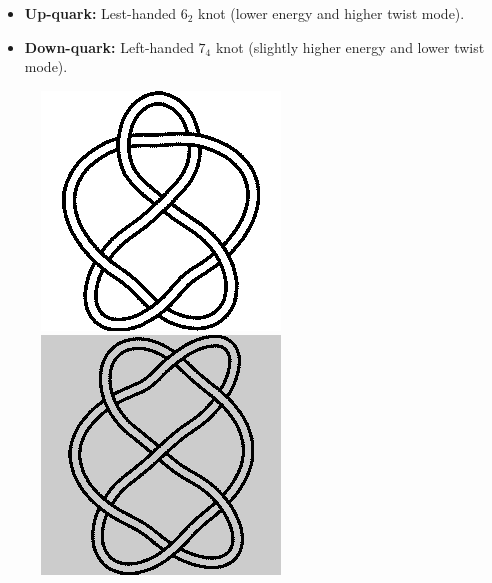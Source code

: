 \documentclass[12pt]{article}
\begin{document}
\begin{itemize}
    \item \textbf{Up-quark:} Lest-handed \( 6_2 \) knot (lower energy and higher twist mode).
    \item \textbf{Down-quark:} Left-handed \( 7_4 \) knot (slightly higher energy and lower twist mode).
\end{itemize}

\begin{figure}[H]
\centering
\begin{minipage}{0.25\textwidth}
    \centering
        \includegraphics[width=\textwidth]{images/6_2.png}
\end{minipage}
\hspace{1em}
\begin{minipage}{0.25\textwidth}
    \centering
        \includegraphics[width=\textwidth]{images/7_4.png}

\end{minipage}
\end{figure}
\end{document}

